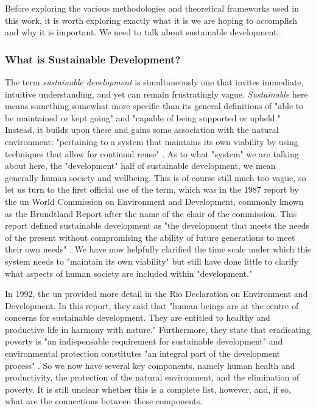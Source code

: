 Before exploring the various methodologies and theoretical frameworks used in this work, it is worth exploring exactly what it is we are hoping to accomplish and why it is important. We need to talk about sustainable development.
 
\subsubsection{What is Sustainable Development?} \label{sec:sustain}

The term \textit{sustainable development} is simultaneously one that invites immediate, intuitive understanding, and yet can remain frustratingly vague. \textit{Sustainable} here means something somewhat more specific than its general definitions of "able to be maintained or kept going" and "capable of being supported or upheld." Instead, it builds upon these and gains some association with the natural environment: "pertaining to a system that maintains its own viability by using techniques that allow for continual reuse" \cite{DefinitionSustainableDictionary}. As to what "system" we are talking about here, the "development" half of sustainable development, we mean generally human society and wellbeing. This is of course still much too vague, so let us turn to the first official use of the term, which was in the 1987 report by the \ac{un} World Commission on Environment and Development, commonly known as the Brundtland Report after the name of the chair of the commission. This report defined sustainable development as "the development that meets the needs of the present without compromising the ability of future generations to meet their own needs" \cite{worldcommissiononenvironmentanddevelopmentOurCommonFuture}. We have now helpfully clarified the time scale under which this system needs to "maintain its own viability" but still have done little to clarify what aspects of human society are included within "development." 

In 1992, the \ac{un} provided more detail in the Rio Declaration on Environment and Development. In this report, they said that "human beings are at the centre of concerns for sustainable development. They are entitled to healthy and productive life in harmony with nature." Furthermore, they state that eradicating poverty is "an indispensable requirement for sustainable development" and environmental protection constitutes "an integral part of the development process" \cite{unitednationsconferenceonenvironmentanddevelopmentRioDeclarationEnvironment1992}. So we now have several key components, namely human health and productivity, the protection of the natural environment, and the elimination of poverty. It is still unclear whether this is a complete list, however, and, if so, what are the connections between these components.

